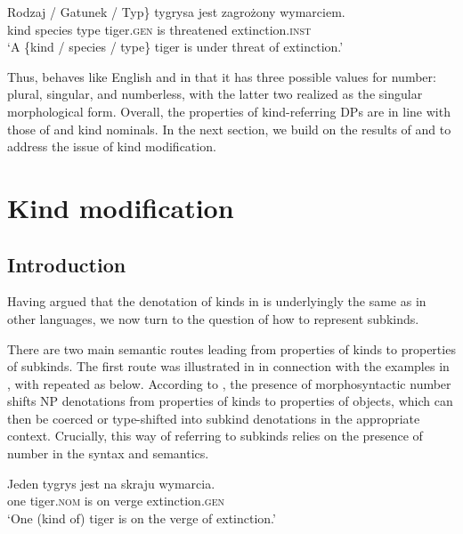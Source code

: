\documentclass[output=paper]{langscibook}
\begin{document}
\ea \gll
\minsp{\{} Rodzaj / Gatunek / Typ\} tygrysa jest zagrożony wymarciem.\\
{} kind {} species {} type tiger.\textsc{gen} is threatened extinction.\textsc{inst}\\
\glt `A \{kind / species / type\} tiger is under threat of extinction.'
\label{ex:tiger_class}
\z

\noindent
Thus,  behaves like English and  in that it has three possible values for number: plural, singular, and numberless, with the latter two realized as the singular morphological form. Overall, the properties of  kind-referring DPs are in line with those of  and  kind nominals.
In the next section, we build on the results of  and  to address the issue of kind modification.


\section{Kind modification}\label{sec:4-subkinds}

\subsection{Introduction}

Having argued that the denotation of kinds in  is underlyingly the same as in other languages, we now turn to the question of how to represent subkinds.

There are two main semantic routes leading from properties of kinds to properties of subkinds. The first route was illustrated in  in connection with the examples in , with  repeated as  below. According to \citeauthor{Borik.Espinal2012}, the presence of morphosyntactic number shifts NP denotations from properties of kinds to properties of objects, which can then be coerced or type-shifted into subkind denotations in the appropriate context. Crucially, this way of referring to subkinds relies on the presence of number in the syntax and semantics.

\ea \label{ex:subkind_1} \gll
Jeden tygrys jest na skraju wymarcia.\\
one tiger.\textsc{nom} is on verge extinction.\textsc{gen}\\
\glt `One (kind of) tiger is on the verge of extinction.'
\z
\end{document}
